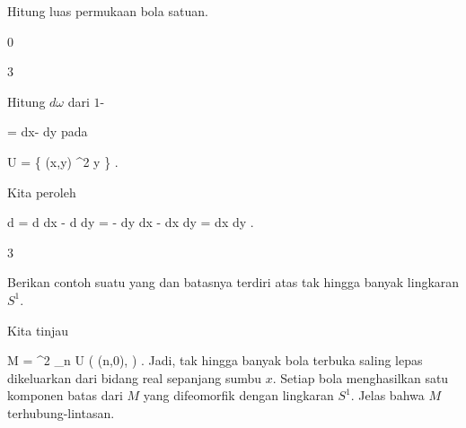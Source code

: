 {

Hitung luas permukaan bola satuan.

}
{  }



{0}

{

}
{  }



{3}

{

Hitung
$d \omega$ dari
$1$-

\mavergleichskettedisp
{\vergleichskette
{ \omega
}
{ =} { {  } dx- {  } dy
}
{ } {
}
{ } {
}
{ } {
}
}
{}{}{}
pada

\mavergleichskette
{\vergleichskette
{ U
}
{ = }{ \left\{ (x,y) \in \R^2  \mid   y          \right\}
}
{  }{
}
{    }{
}
{   }{
}
}
{}{}{.}

}
{

Kita peroleh

\mavergleichskettealign
{\vergleichskettealign
{d \omega
}
{ =} { d {  } \wedge dx - d {  } \wedge dy
}
{ =} { - {  } dy  \wedge dx  -   {  }  dx \wedge dy
}
{ =} { {  }  dx \wedge dy
}
{ } {
}
}
{}
{}{.}

 }



{3}

{

Berikan contoh suatu
yang
dan batasnya terdiri atas
 {} {}
tak hingga banyak lingkaran $S^1$.

}
{

Kita tinjau

\mavergleichskettedisp
{\vergleichskette
{ M
}
{ =} { \R^2 \setminus \biguplus_{n \in \Z} U \left(  (n,0), {  }   \right)
}
{ } {
}
{ } {
}
{ } {
}
}
{}{}{.}
Jadi, tak hingga banyak bola terbuka saling lepas dikeluarkan dari bidang real sepanjang sumbu $x$. Setiap bola menghasilkan satu komponen batas dari $M$ yang difeomorfik dengan lingkaran $S^1$. Jelas bahwa $M$ terhubung-lintasan.

 }



